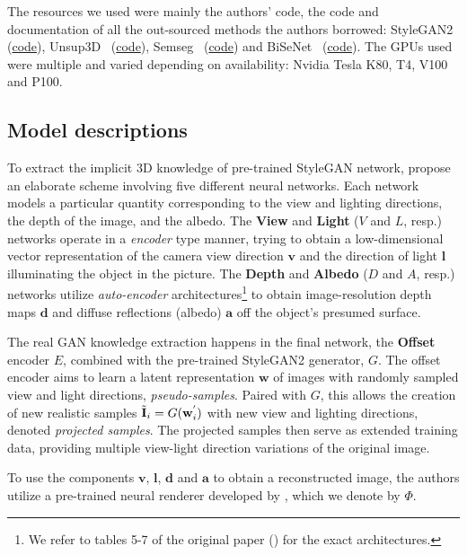 The resources we used were mainly the authors' code, the code and documentation of all the out-sourced methods the authors borrowed: StyleGAN2~\cite{stylegan2} (\href{https://github.com/rosinality/stylegan2-pytorch}{code}), Unsup3D~\cite{wu2020unsupervised} (\href{https://github.com/elliottwu/unsup3d}{code}), Semseg~\cite{semseg2019} (\href{https://github.com/hszhao/semseg}{code}) and BiSeNet~\cite{bisenet, bisenet2} (\href{https://github.com/zllrunning/face-parsing.PyTorch}{code}). The GPUs used were multiple and varied depending on availability: Nvidia Tesla K80, T4, V100 and P100.

\subsection{Model descriptions}
To extract the implicit 3D knowledge of pre-trained StyleGAN network, \textcite{gan2shape} propose an elaborate scheme involving five different neural networks. Each network models a particular quantity corresponding to the view and lighting directions, the depth of the image, and the albedo. The \textbf{View} and \textbf{Light} ($V$ and $L$, resp.) networks operate in a \textit{encoder} type manner, trying to obtain a low-dimensional vector representation of the camera view direction $\textbf{v}$ and the direction of light $\textbf{l}$ illuminating the object in the picture. 
The \textbf{Depth} and \textbf{Albedo} ($D$ and $A$, resp.) networks utilize \textit{auto-encoder} architectures\footnote{We refer to tables 5-7 of the original paper (\cite{gan2shape}) for the exact architectures.} to obtain image-resolution depth maps $\textbf{d}$ and diffuse reflections (albedo) $\textbf{a}$ off the object's presumed surface.

The real GAN knowledge extraction happens in the final network, the \textbf{Offset} encoder $E$, combined with the pre-trained StyleGAN2 generator, $G$. The offset encoder aims to learn a latent representation $\textbf{w}$ of images with randomly sampled view and light directions, \textit{pseudo-samples}.
Paired with $G$, this allows the creation of new realistic samples $\Tilde{\textbf{I}}_i = G(\textbf{w}^{'}_{i})$ with new view and lighting directions, denoted \textit{projected samples}.
The projected samples then serve as extended training data, providing multiple view-light direction variations of the original image.

To use the components $\textbf{v}$, $\textbf{l}$, $\textbf{d}$ and $\textbf{a}$ to obtain a reconstructed image, the authors utilize a pre-trained neural renderer developed by \textcite{neural-renderer}, which we denote by $\Phi$.

